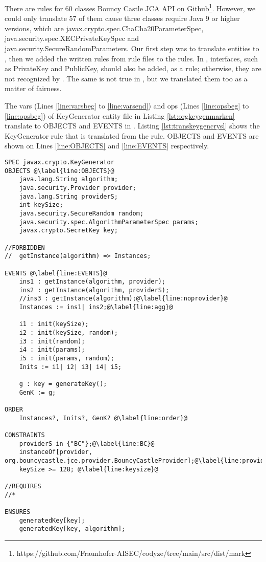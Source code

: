There are \MARK{} rules for 60 classes Bouncy Castle JCA API on Github\footnote{https://github.com/Fraunhofer-AISEC/codyze/tree/main/src/dist/mark}. However, we could only translate 57 of them cause three classes require Java 9 or higher versions, which are javax.crypto.spec.ChaCha20ParameterSpec, java.security.spec.XECPrivateKeySpec and java.\-security.SecureRandomParameters. Our first step was to translate \MARK{} entities to \crysl, then we added the written \MARK{} rules from rule files to the \crysl{} rules. In \MARK, interfaces, such as PrivateKey and PublicKey, should also be added, as a rule; otherwise, they are not recognized by \MARK. The same is not true in \crysl, but we translated them too as a matter of fairness.

The vars (Lines \ref{line:varsbeg} to \ref{line:varsend}) and ops (Lines \ref{line:opsbeg} to \ref{line:opsbeg}) of KeyGenerator entity \MARK{} file in Listing \ref{lst:orgkeygenmarken} translate to OBJECTS and EVENTS in \crysl. Listing \ref{lst:transkeygencrysl} shows the KeyGenerator \crysl{} rule that is translated from the \MARK{} rule. OBJECTS and EVENTS are shown on Lines \ref{line:OBJECTS} and \ref{line:EVENTS} respectively.
\pagebreak
\begin{lstlisting}[language= CrySL,caption= {Translated KeyGenerator \MARK{} rule\protect\footnotemark~to \crysl{} from Bouncy Castle JCA API.}, label={lst:transkeygencrysl}, escapechar=@]
SPEC javax.crypto.KeyGenerator
OBJECTS @\label{line:OBJECTS}@
	java.lang.String algorithm;
	java.security.Provider provider;
	java.lang.String providerS;
	int keySize;
	java.security.SecureRandom random;
	java.security.spec.AlgorithmParameterSpec params;
	javax.crypto.SecretKey key;
	
//FORBIDDEN
//	getInstance(algorithm) => Instances;

EVENTS @\label{line:EVENTS}@
	ins1 : getInstance(algorithm, provider);
	ins2 : getInstance(algorithm, providerS);
	//ins3 : getInstance(algorithm);@\label{line:noprovider}@
	Instances := ins1| ins2;@\label{line:agg}@
	
	i1 : init(keySize);
	i2 : init(keySize, random);
	i3 : init(random);
	i4 : init(params);
	i5 : init(params, random);
	Inits := i1| i2| i3| i4| i5;

	g : key = generateKey();
	GenK := g;
	
ORDER
	Instances?, Inits?, GenK? @\label{line:order}@

CONSTRAINTS
	providerS in {"BC"};@\label{line:BC}@
	instanceOf[provider, org.bouncycastle.jce.provider.BouncyCastleProvider];@\label{line:provider}@
	keySize >= 128; @\label{line:keysize}@

//REQUIRES
//*

ENSURES
	generatedKey[key];
	generatedKey[key, algorithm];
\end{lstlisting}

